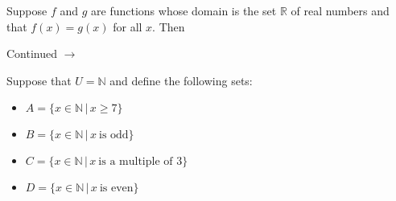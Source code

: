 \documentclass[addpoints]{exam}
\def\pageturn{\vfill
\begin{flushright}
	\begin{small}
		Continued $\rightarrow$
	\end{small}
\end{flushright}
\newpage}
\begin{document}
\begin{questions}


\question[2] Suppose $f$ and $g$ are functions whose domain is the set $\mathbb{R}$ of real numbers and that $f(x) = g(x)$ for all $x$. Then 


\pageturn

\question Suppose that $U = \mathbb{N}$ and define the following sets: 
\begin{itemize}
	\item $A = \{ x \in \mathbb{N} \, | \, x \geq 7 \}$
	\item $B = \{ x \in \mathbb{N} \, | \, x \ \text{is odd} \}$
	\item $C = \{ x \in \mathbb{N} \, | \, x \ \text{is a multiple of 3} \}$
	\item $D = \{ x \in \mathbb{N} \, | \, x \ \text{is even} \}$


\end{itemize}
\end{questions}
\end{document}
